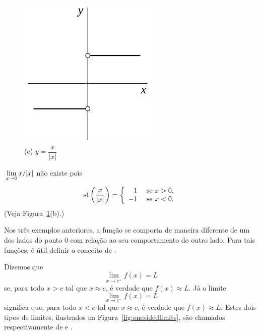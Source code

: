\begin{figure}
\begin{minipage}{0.3\textwidth}
\centering
\includegraphics{cap3p3ex9}\\
(c) \; $y = \dfrac{x}{|x|}$
\end{minipage}%
\caption{}\label{fig:cap3p3exs789}
\end{figure}

\begin{example}\label{ex:cap3p3ex9}
$\dslim{x \to 0} x/|x|$ não existe pois 
$$
  \operatorname{st}\left(\frac{x}{|x|}\right) = \left\{ \begin{array}{rl}
                          1 & \text{ se } x > 0, \\
                         -1 & \text{ se } x < 0.
                       \end{array} \right.
$$
(Veja Figura~\ref{fig:cap3p3exs789}(b).)
\end{example}

Nos três exemplos anteriores, a função se comporta de maneira diferente de
um dos lados do ponto $0$ com relação ao seu comportamento do outro lado.
Para tais funções, é útil definir o conceito de
.

Dizemos que
$$
  \lim_{x \to c^+} f(x) = L
$$
se, para todo $x > c$ tal que $x \approx c$, é verdade que $f(x) \approx L$.
Já o limite
$$
  \lim_{x \to c^-} f(x) = L
$$
significa que, para todo $x < c$ tal que $x \approx c$, é verdade que
$f(x) \approx L$. Estes dois tipos de limites, ilustrados na
Figura~\ref{fig:onesidedlimits}, são chamados respectivamente de
 e
.

